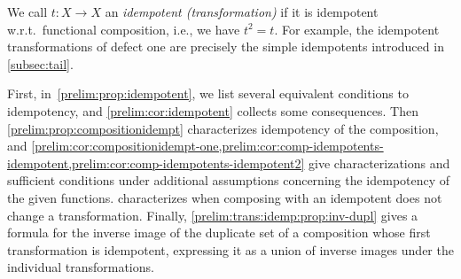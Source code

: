 
We call $t \colon X \to X$ an \emph{idempotent (transformation)}
if it is idempotent w.r.t.~functional composition, i.e., we have $t^2 = t$.
For example, the idempotent transformations of defect one are precisely the
simple idempotents introduced in \cref{subsec:tail}.

First, in~\cref{prelim:prop:idempotent}, we list several equivalent conditions
to idempotency, and \cref{prelim:cor:idempotent} collects some consequences.
Then \cref{prelim:prop:compositionidempt} characterizes idempotency of the
composition, and
\cref{prelim:cor:compositionidempt-one,prelim:cor:comp-idempotents-idempotent,prelim:cor:comp-idempotents-idempotent2}
give characterizations and sufficient conditions under additional assumptions
concerning the idempotency of the given functions.
 characterizes when composing with an
idempotent does not change a transformation.
Finally, \cref{prelim:trans:idemp:prop:inv-dupl} gives a formula for the inverse image
of the duplicate set of a composition whose first transformation is idempotent,
expressing it as a union of inverse images under the individual transformations.


